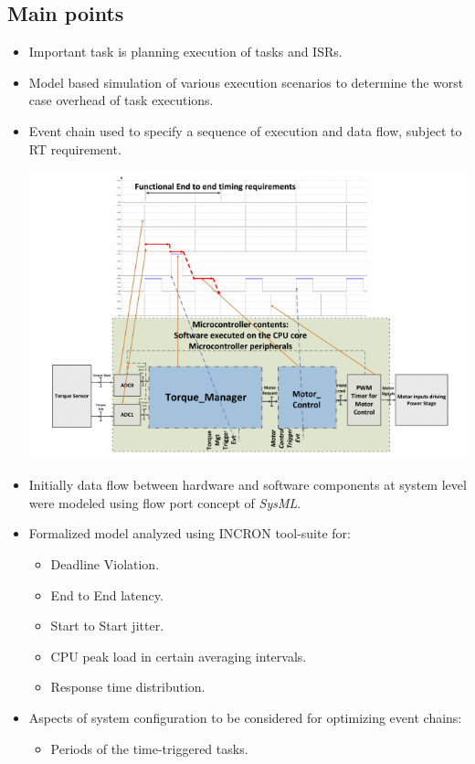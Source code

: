 \subsection*{Main points}
\begin{itemize}
	\item Important task is planning execution of tasks and ISRs.
	\item Model based simulation of various execution scenarios to determine the worst case overhead of task executions.
	\item Event chain used to specify a sequence of execution and data flow, subject to RT requirement.
	\begin{minipage}{\linewidth}
		\centering
		\includegraphics[width=13cm]{Pictures/Event-chain.png}
	\end{minipage}
	\item Initially data flow between hardware and software components at system level were modeled using flow port concept of \textit{SysML}.
	\item Formalized model analyzed using INCRON tool-suite for:
	\begin{itemize}
		\item Deadline Violation.
		\item End to End latency.
		\item Start to Start jitter.
		\item CPU peak load in certain averaging intervals.
		\item Response time distribution.
	\end{itemize}
	\item Aspects of system configuration to be considered for optimizing event chains:
	\begin{itemize}
		\item Periods of the time-triggered tasks.

\end{itemize}
\end{itemize}

